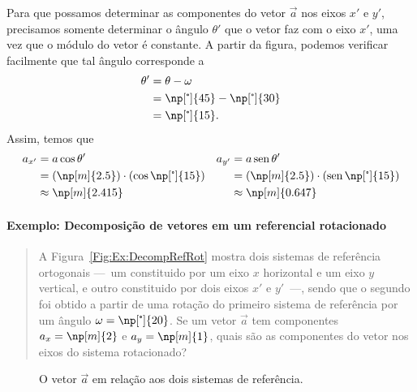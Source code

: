Para que possamos determinar as componentes do vetor $\vec{a}$ nos eixos $x'$ e $y'$, precisamos somente determinar o ângulo $\theta'$ que o vetor faz com o eixo $x'$, uma vez que o módulo do vetor é constante. A partir da figura, podemos verificar facilmente que tal ângulo corresponde a
\begin{align}
    \theta' &= \theta - \omega \\
    &= \np[\tcdegree]{45} - \np[\tcdegree]{30} \\
    &= \np[\tcdegree]{15}.
\end{align}
%
Assim, temos que
\begin{align}
    a_{x'} &= a\cos\theta' & a_{y'} &= a\sen\theta' \\
    &= (\np[m]{2.5})\cdot(\cos\np[\tcdegree]{15}) & &= (\np[m]{2.5})\cdot(\sen\np[\tcdegree]{15}) \\
    &\approx \np[m]{2.415} & &\approx \np[m]{0.647}
\end{align}

\paragraph{Exemplo: Decomposição de vetores em um referencial rotacionado}

\begin{quote}
    A Figura~\ref{Fig:Ex:DecompRefRot} mostra dois sistemas de referência ortogonais ---~um constituido por um eixo $x$ horizontal e um eixo $y$ vertical, e outro constituido por dois eixos $x'$ e $y'$~---, sendo que o segundo foi obtido a partir de uma rotação do primeiro sistema de referência por um ângulo $\omega = \np[\tcdegree]{20}$. Se um vetor $\vec{a}$ tem componentes $a_x = \np[m]{2}$ e $a_y = \np[m]{1}$, quais são as componentes do vetor nos eixos do sistema rotacionado?
\end{quote}

\begin{figure}
\centering
{}
\caption{O vetor $\vec{a}$ em relação aos dois sistemas de referência. \label{Fig:Ex:DecompRefRotModAng}}
\end{figure}

